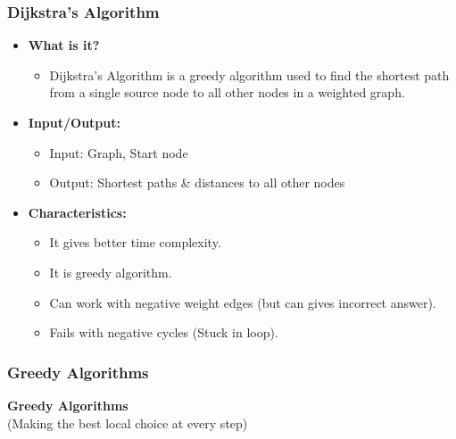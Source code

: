 \documentclass[10pt,aspectratio=43]{beamer}
\begin{document}
\begin{frame}
    \frametitle{Dijkstra's Algorithm}
    \begin{itemize}
        \item \textcolor{myMaroon}{\textbf{What is it?}}
        \begin{itemize}
            \item Dijkstra’s Algorithm is a greedy algorithm used to find the shortest path from a single source node to all other nodes in a weighted graph.
        \end{itemize}
        

        \vspace{0.3cm}
        \item \textcolor{myMaroon}{\textbf{Input/Output:}}
        \begin{itemize}
            \item Input: Graph, Start node
            \item Output: Shortest paths \& distances to all other nodes
        \end{itemize}


        \vspace{0.3cm}
        \item \textcolor{myMaroon}{\textbf{Characteristics:}}
        \begin{itemize}
            \item It gives better time complexity.
            \item It is greedy algorithm.
            \item Can work with negative weight edges (but can gives incorrect answer).
            \item Fails with negative cycles (Stuck in loop).
        \end{itemize}
        
    \end{itemize}


\end{frame}



\begin{frame}
    \frametitle{\textcolor{myMaroon}{Greedy Algorithms}}
    \begin{center}
        {\Large \textbf{\textcolor{myMaroon}{Greedy Algorithms}}} \\
        \vspace{0.3cm}
        {\large \textcolor{myBlue}{(Making the best local choice at every step)}}
    \end{center}

\end{frame}
\end{document}
